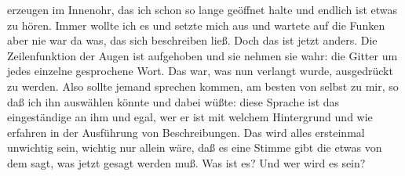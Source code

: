 \documentclass[
]{article}
\begin{document}
erzeugen im Innenohr, das ich schon so lange geöffnet halte und endlich
ist etwas zu hören. Immer wollte ich es und setzte mich aus und wartete
auf die Funken aber nie war da was, das sich beschreiben ließ. Doch das
ist jetzt anders. Die Zeilenfunktion der Augen ist aufgehoben und sie
nehmen sie wahr: die Gitter um jedes einzelne gesprochene Wort. Das war,
was nun verlangt wurde, ausgedrückt zu werden. Also sollte jemand
sprechen kommen, am besten von selbst zu mir, so daß ich ihn auswählen
könnte und dabei wüßte: diese Sprache ist das eingeständige an ihm und
egal, wer er ist mit welchem Hintergrund und wie erfahren in der
Ausführung von Beschreibungen. Das wird alles ersteinmal unwichtig sein,
wichtig nur allein wäre, daß es eine Stimme gibt die etwas von dem sagt,
was jetzt gesagt werden muß. Was ist es? Und wer wird es sein?
\end{document}
